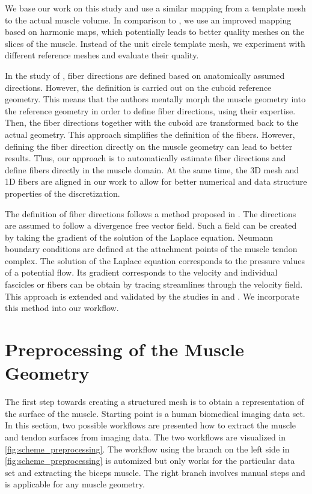 We base our work on this study and use a similar mapping from a template mesh to the actual muscle volume. In comparison to \cite{blemker2005three}, we use an improved mapping based on harmonic maps, which potentially leads to better quality meshes on the slices of the muscle. Instead of the unit circle template mesh, we experiment with different reference meshes and evaluate their quality.

In the study of \cite{blemker2005three}, fiber directions are defined based on anatomically assumed directions.
However, the definition is carried out on the cuboid reference geometry. This means that the authors mentally morph the muscle geometry into the reference geometry in order to define fiber directions, using their expertise. Then, the fiber directions together with the cuboid are transformed back to the actual geometry. This approach simplifies the definition of the fibers. However, defining the fiber direction directly on the muscle geometry can lead to better results. Thus, our approach is to automatically estimate fiber directions and define fibers directly in the muscle domain. At the same time, the 3D mesh and 1D fibers are aligned in our work to allow for better numerical and data structure properties of the discretization. 

The definition of fiber directions follows a method proposed in \cite{Choi2013}. 
The directions are assumed to follow a divergence free vector field. Such a field can be created by taking the gradient of the solution of the Laplace equation. Neumann boundary conditions are defined at the attachment points of the muscle tendon complex. The solution of the Laplace equation corresponds to the pressure values of a potential flow. Its gradient corresponds to the velocity and individual fascicles or fibers can be obtain by tracing streamlines through the velocity field.
This approach is extended and validated by the studies in \cite{Inouye2015} and \cite{Handsfield2017}. We incorporate this method into our workflow.

\section{Preprocessing of the Muscle Geometry}\label{sec:preprocessing_of_the_muscle_geometry}

The first step towards creating a structured mesh is to obtain a representation of the surface of the muscle. 
Starting point is a human biomedical imaging data set. In this section, two possible workflows are presented how to extract the muscle and tendon surfaces from imaging data. 
The two workflows are visualized in \cref{fig:scheme_preprocessing}. The workflow using the branch on the left side in \cref{fig:scheme_preprocessing} is automized but only works for the particular data set and extracting the biceps muscle.
The right branch involves manual steps and is applicable for any muscle geometry.

